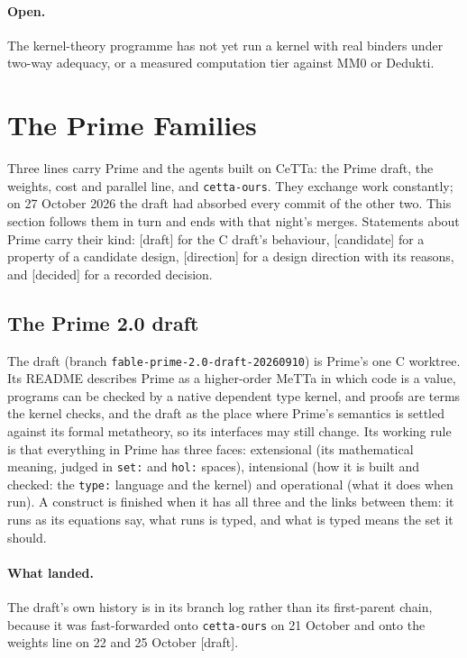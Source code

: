 \documentclass[11pt]{article}
\newcommand{\code}[1]{\texttt{#1}}
\newcommand{\kind}[1]{\textsf{\small[#1]}}
\newcommand{\CeTTa}{\textup{CeTTa}}
\begin{document}
\paragraph{Open.} The kernel-theory programme has
not yet run a kernel with real binders under two-way adequacy, or a measured
computation tier against MM0 or Dedukti.

\section{The Prime Families}
\label{sec:prime-families}

Three lines carry Prime and the agents built on \CeTTa{}: the Prime draft,
the weights, cost and parallel line, and \code{cetta-ours}.  They exchange
work constantly; on 27 October 2026 the draft had absorbed every commit of
the other two.  This section follows them in turn and ends with that night's
merges.  Statements about Prime carry their kind: \kind{draft} for the C
draft's behaviour, \kind{candidate} for a property of a candidate design,
\kind{direction} for a design direction with its reasons, and \kind{decided}
for a recorded decision.

\subsection{The Prime 2.0 draft}
\label{sec:line-draft}

The draft (branch \code{fable-prime-2.0-draft-20260910}) is Prime's one C
worktree.  Its README describes Prime as a higher-order MeTTa in which code is
a value, programs can be checked by a native dependent type kernel, and proofs
are terms the kernel checks, and the draft as the place where Prime's
semantics is settled against its formal metatheory, so its interfaces may
still change.  Its working rule is that everything in Prime has three faces:
extensional (its mathematical meaning, judged in \code{set:} and \code{hol:}
spaces), intensional (how it is built and checked: the \code{type:} language
and the kernel) and operational (what it does when run).  A construct is
finished when it has all three and the links between them: it runs as its
equations say, what runs is typed, and what is typed means the set it should.

\paragraph{What landed.}  The draft's own history is in its branch log rather
than its first-parent chain, because it was fast-forwarded onto
\code{cetta-ours} on 21 October and onto the weights line on 22 and
25 October \kind{draft}.
\end{document}
